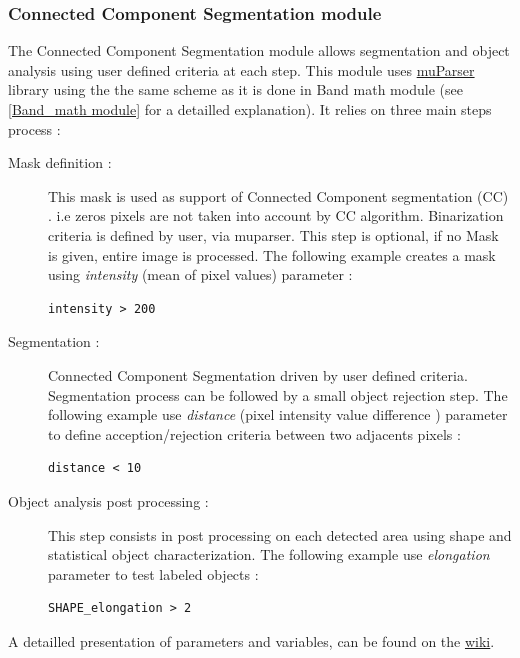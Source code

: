 \subsubsection{Connected Component Segmentation module}

The Connected Component Segmentation module allows segmentation and object analysis using user defined criteria at each step. This module uses \href{http://muparser.sourceforge.net/}{muParser} library using the the same scheme as it is done in Band math module (see \ref{Band_math module} for a detailled explanation). It relies on three main steps process :

\begin{description}
\item[Mask definition :] This mask is used as support of Connected Component segmentation (CC) . i.e zeros pixels are not taken into account by CC algorithm. Binarization criteria is defined by user, via muparser. This step is optional, if no Mask is given, entire image is processed. The following example creates a mask using \emph{intensity} (mean of pixel values) parameter :

\begin{verbatim}
intensity > 200
\end{verbatim}
  
\item[Segmentation :] Connected Component Segmentation driven by user defined criteria. Segmentation process can be followed by a small object rejection step. The following example use \emph{distance} (pixel intensity value difference ) parameter to define acception/rejection criteria between two adjacents pixels :

\begin{verbatim}
distance < 10
\end{verbatim}
  
\item[Object analysis post processing :] This step consists in post processing on each detected area using shape and statistical object characterization. The following example use \emph{elongation} parameter to test labeled objects :

\begin{verbatim}
SHAPE_elongation > 2
\end{verbatim}
 
\end{description}

 A detailled presentation of parameters and variables, can be found on the \href{http://wiki.orfeo-toolbox.org/index.php/Connected_component_segmentation_module}{wiki}. 

